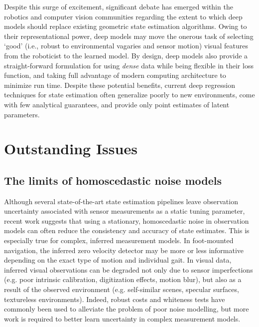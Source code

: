 Despite this surge of excitement, significant debate has emerged within the robotics and computer vision communities regarding the extent to which deep models should replace existing geometric state estimation algorithms. Owing to their representational power, deep models may move the onerous task of selecting `good' (i.e., robust to environmental vagaries and sensor motion) visual features from the roboticist to the learned model. By design, deep models also provide a straight-forward formulation for using \textit{dense} data while being flexible in their loss function, and taking full advantage of modern computing architecture to minimize run time. Despite these potential benefits, current deep regression techniques for state estimation often generalize poorly to new environments, come with few analytical guarantees, and provide only point estimates of latent parameters.


\section{Outstanding Issues}

\subsection{The limits of homoscedastic noise models}

Although several state-of-the-art state estimation pipelines  \citep{Leutenegger2015-fk, Cvisic2015-mt} leave observation uncertainty associated with sensor measurements as a static tuning parameter, recent work \citep{Vega-Brown2014-sb, Hu2015-uw} suggests that using a stationary, homoscedastic noise in observation models can often reduce the consistency and accuracy of state estimates. This is especially true for complex, inferred measurement models. In foot-mounted navigation, the inferred zero velocity detector may be more or less informative depending on the exact type of motion and individual gait. In visual data, inferred visual observations can be degraded not only due to sensor imperfections (e.g. poor intrinsic calibration, digitization effects, motion blur), but also as a result of the observed environment (e.g. self-similar scenes, specular surfaces, textureless environments). Indeed, robust costs \cite{Alcantarilla2016-kv, MacTavish2015-wt, Agarwal2013-jq} and whiteness tests \citep{Tsotsos2015-qs} have commonly been used to alleviate the problem of poor noise modelling, but more work is required to better learn uncertainty in complex measurement models.



